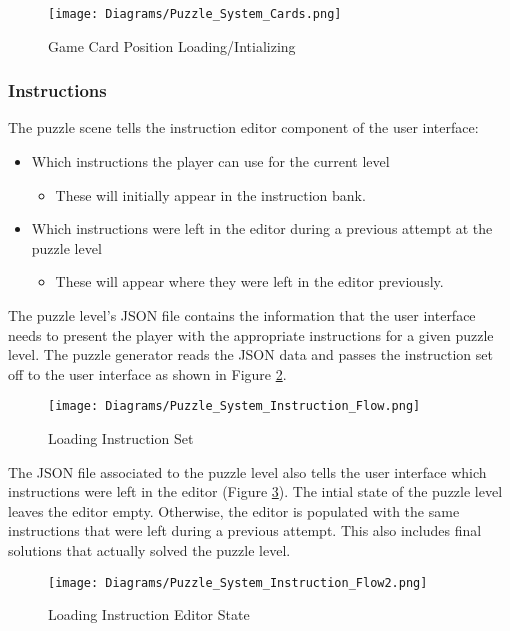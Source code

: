 \begin{figure}[!hb]
  \caption{Game Card Position Loading/Intializing}
  \label{fig:Puzzle_System_Cards}
  \centering
  \texttt{[image: Diagrams/Puzzle\_System\_Cards.png]}
\end{figure}
\newpage

\subsubsection{Instructions}
The puzzle scene tells the instruction editor component of the user interface:
\begin{itemize}
  \item Which instructions the player can use for the current level
  \begin{itemize}
    \item These will initially appear in the instruction bank.
  \end{itemize}
  \item Which instructions were left in the editor during a previous attempt at
  the puzzle level
  \begin{itemize}
    \item These will appear where they were left in the editor previously.
  \end{itemize}
\end{itemize}

The puzzle level's JSON file contains the information that the user interface
needs to present the player with the appropriate instructions for a given puzzle level.
The puzzle generator reads the JSON data and passes the instruction set off to the user interface
as shown in Figure \ref{fig:Instruction_Flow}.

\begin{figure}[!hb]
  \caption{Loading Instruction Set}
  \label{fig:Instruction_Flow}
  \centering
  \texttt{[image: Diagrams/Puzzle\_System\_Instruction\_Flow.png]}
\end{figure}

The JSON file associated to the puzzle level also tells the user interface which
instructions were left in the editor (Figure \ref{fig:Instruction_Flow2}). The intial state of the puzzle level leaves the
editor empty. Otherwise, the editor is populated with the same instructions that were
left during a previous attempt. This also includes final solutions that actually solved the
puzzle level.

\begin{figure}[!hb]
  \caption{Loading Instruction Editor State}
  \label{fig:Instruction_Flow2}
  \centering
  \texttt{[image: Diagrams/Puzzle\_System\_Instruction\_Flow2.png]}
\end{figure}
